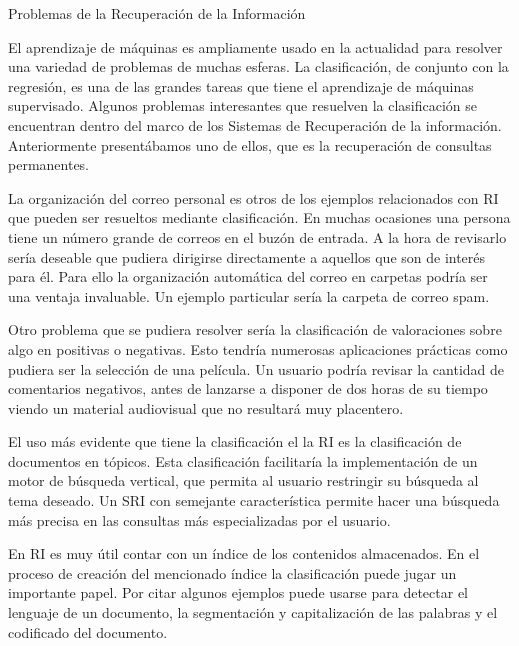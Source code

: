 \documentclass{llncs}
\begin{document}
	\begin{subsection}{Problemas de la Recuperaci\'on de la Informaci\'on}
	
		El aprendizaje de m\'aquinas es ampliamente usado en la actualidad para resolver una variedad de problemas de muchas esferas. La clasificaci\'on, de conjunto con la regresi\'on, es una de las grandes tareas que tiene el aprendizaje de m\'aquinas supervisado. Algunos problemas interesantes que resuelven la clasificaci\'on se encuentran dentro del marco de los Sistemas de Recuperaci\'on de la informaci\'on. Anteriormente presentábamos uno de ellos, que es la recuperaci\'on de consultas permanentes.
		
		La organizaci\'on del correo personal es otros de los ejemplos relacionados con RI que pueden ser resueltos mediante clasificaci\'on. En muchas ocasiones una persona tiene un n\'umero grande de correos en el buz\'on de entrada. A la hora de revisarlo ser\'ia deseable que pudiera dirigirse directamente a aquellos que son de inter\'es para \'el. Para ello la organizaci\'on autom\'atica del correo en carpetas podr\'ia ser una ventaja invaluable. Un ejemplo particular ser\'ia la carpeta de correo spam.
		
		Otro problema que se pudiera resolver ser\'ia la clasificaci\'on de valoraciones sobre algo en positivas o negativas. Esto tendr\'ia numerosas aplicaciones pr\'acticas como pudiera ser la selecci\'on de una pel\'icula. Un usuario podr\'ia revisar la cantidad de comentarios negativos, antes de lanzarse a disponer de dos horas de su tiempo viendo un material audiovisual que no resultar\'a muy placentero.
		
		El uso m\'as evidente que tiene la clasificaci\'on el la RI es la clasificaci\'on de documentos en t\'opicos. Esta clasificaci\'on facilitar\'ia la implementaci\'on de un motor de b\'usqueda vertical, que permita al usuario restringir su b\'usqueda al tema deseado. Un SRI con semejante caracter\'istica permite hacer una b\'usqueda m\'as precisa en las consultas m\'as especializadas por el usuario.
		
		En RI es muy \'util contar con un \'indice de los contenidos almacenados. En el proceso de creaci\'on del mencionado \'indice la clasificaci\'on puede jugar un importante papel. Por citar algunos ejemplos puede usarse para detectar el lenguaje de un documento, la segmentaci\'on y capitalizaci\'on de las palabras y el codificado del documento.

		
	\end{subsection}
		
\end{document}
